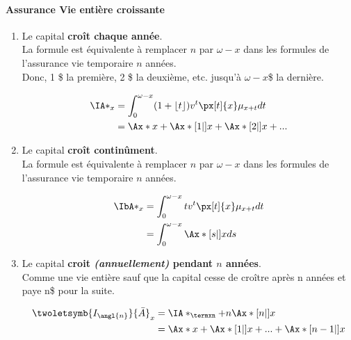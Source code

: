 \documentclass[10pt, french]{article}
\begin{document}
\begin{multicols*}{3}
\paragraph{Assurance Vie entière croissante}

\begin{enumerate}

\item[] Le capital \textbf{croît chaque année}. \\
La formule est équivalente à remplacer $n$ par $\omega - x$ dans les formules de l'assurance vie temporaire $n$ années.\\ 
Donc, 1 \$ la première, 2 \$ la deuxième, etc. jusqu'à \textbf{$\omega - x$}\$ la dernière.

\begin{align*}
	\IA*_{x} &= \int_0^{\omega - x} (1 + \lfloor t \rfloor) v^t \px[t]{x} \mu_{x+t} dt \\
		&= \Ax*{x} + \Ax*[1|]{x} + \Ax*[2|]{x} + ...
\end{align*}

\item[] Le capital \textbf{croît continûment}. \\
La formule est équivalente à remplacer $n$ par $\omega - x$ dans les formules de l'assurance vie temporaire $n$ années.

\begin{align*}
	\IbA*_x &= \int_0^{\omega - x} t v^t \px[t]{x} \mu_{x+t} dt \\
		&= \int_0^{\omega - x} \Ax*[s|]{x} ds 
\end{align*}

\item[] Le capital \textbf{croit \textit{(annuellement)} pendant $n$ années}.\\
Comme une vie entière sauf que la capital cesse de croître après n années et paye n\$ pour la suite.

\begin{align*}
	\twoletsymb{I_{\angl{n}}}{\bar{A}}_{x} 
	&= \IA*_{\termxn} + n \Ax*[n|]{x}\\
	&= \Ax*{x} + \Ax*[1|]{x} + ... + \Ax*[n-1|]{x}
\end{align*}


\end{enumerate}
\end{multicols*}
\end{document}
